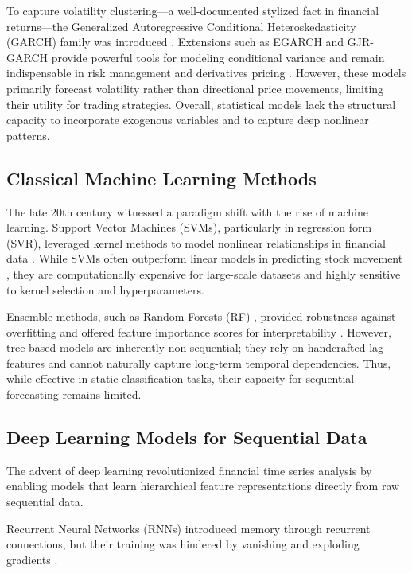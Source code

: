 \documentclass{cys}
\begin{document}
To capture volatility clustering—a well-documented stylized fact in financial returns—the Generalized Autoregressive Conditional Heteroskedasticity (GARCH) family was introduced \cite{bollerslev1986generalized}. Extensions such as EGARCH and GJR-GARCH provide powerful tools for modeling conditional variance and remain indispensable in risk management and derivatives pricing \cite{engle1982autoregressive}. However, these models primarily forecast volatility rather than directional price movements, limiting their utility for trading strategies. Overall, statistical models lack the structural capacity to incorporate exogenous variables and to capture deep nonlinear patterns.

\subsection{Classical Machine Learning Methods}
The late 20th century witnessed a paradigm shift with the rise of machine learning. Support Vector Machines (SVMs), particularly in regression form (SVR), leveraged kernel methods to model nonlinear relationships in financial data \cite{cortes1995support}. While SVMs often outperform linear models in predicting stock movement \cite{huang2005forecasting}, they are computationally expensive for large-scale datasets and highly sensitive to kernel selection and hyperparameters.

Ensemble methods, such as Random Forests (RF) \cite{breiman2001random}, provided robustness against overfitting and offered feature importance scores for interpretability \cite{kumar2016random}. However, tree-based models are inherently non-sequential; they rely on handcrafted lag features and cannot naturally capture long-term temporal dependencies. Thus, while effective in static classification tasks, their capacity for sequential forecasting remains limited.


\subsection{Deep Learning Models for Sequential Data}
The advent of deep learning revolutionized financial time series analysis by enabling models that learn hierarchical feature representations directly from raw sequential data.

Recurrent Neural Networks (RNNs) introduced memory through recurrent connections, but their training was hindered by vanishing and exploding gradients \cite{bengio1994learning}.
\end{document}
